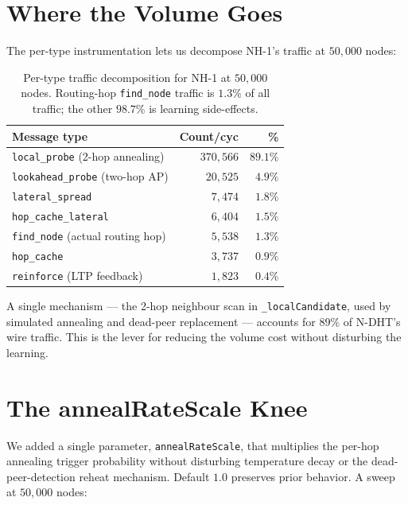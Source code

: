 \documentclass[twoside,nobib]{tufte-book}
\newcommand{\NDHT}{N-DHT\xspace}
\begin{document}
\section{Where the Volume Goes}

The per-type instrumentation lets us decompose NH-1's traffic at
$50{,}000$ nodes:

\begin{table}[h]
\centering
\caption{Per-type traffic decomposition for NH-1 at $50{,}000$
nodes. Routing-hop \texttt{find\_node} traffic is $1.3\%$ of
all traffic; the other $98.7\%$ is learning side-effects.}
\label{tab:bw-types}
\small
\begin{tabular}{@{}lrr@{}}
\toprule
\textbf{Message type} & \textbf{Count/cyc} & \textbf{\%} \\
\midrule
\texttt{local\_probe} (2-hop annealing) & $370{,}566$ & $\mathbf{89.1\%}$ \\
\texttt{lookahead\_probe} (two-hop AP) & $20{,}525$ & $4.9\%$ \\
\texttt{lateral\_spread} & $7{,}474$ & $1.8\%$ \\
\texttt{hop\_cache\_lateral} & $6{,}404$ & $1.5\%$ \\
\texttt{find\_node} (actual routing hop) & $5{,}538$ & $1.3\%$ \\
\texttt{hop\_cache} & $3{,}737$ & $0.9\%$ \\
\texttt{reinforce} (LTP feedback) & $1{,}823$ & $0.4\%$ \\
\bottomrule
\end{tabular}
\end{table}

A single mechanism --- the 2-hop neighbour scan in
\texttt{\_localCandidate}, used by simulated annealing and
dead-peer replacement --- accounts for $89\%$ of \NDHT's
wire traffic. This is the lever for reducing the volume cost
without disturbing the learning.

\section{The annealRateScale Knee}

We added a single parameter, \texttt{annealRateScale}, that
multiplies the per-hop annealing trigger probability without
disturbing temperature decay or the dead-peer-detection reheat
mechanism. Default $1.0$ preserves prior behavior. A sweep at
$50{,}000$ nodes:
\end{document}
